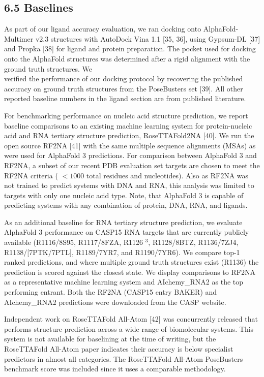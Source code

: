 \documentclass[10pt]{article}
\begin{document}
\subsection*{6.5 Baselines}
As part of our ligand accuracy evaluation, we ran docking onto AlphaFold-Multimer v2.3 structures with AutoDock Vina 1.1 [35, 36], using Gypsum-DL [37] and Propka [38] for ligand and protein preparation. The pocket used for docking onto the AlphaFold structures was determined after a rigid alignment with the ground truth structures. We\\[0pt]
verified the performance of our docking protocol by recovering the published accuracy on ground truth structures from the PoseBusters set [39]. All other reported baseline numbers in the ligand section are from published literature.

For benchmarking performance on nucleic acid structure prediction, we report baseline comparisons to an existing machine learning system for protein-nucleic acid and RNA tertiary structure prediction, RoseTTAFold2NA [40]. We run the open source RF2NA [41] with the same multiple sequence alignments (MSAs) as were used for AlphaFold 3 predictions. For comparison between AlphaFold 3 and RF2NA, a subset of our recent PDB evaluation set targets are chosen to meet the RF2NA criteria ( $<1000$ total residues and nucleotides). Also as RF2NA was not trained to predict systems with DNA and RNA, this analysis was limited to targets with only one nucleic acid type. Note, that AlphaFold 3 is capable of predicting systems with any combination of protein, DNA, RNA, and ligands.

As an additional baseline for RNA tertiary structure prediction, we evaluate AlphaFold 3 performance on CASP15 RNA targets that are currently publicly available (R1116/8S95, R1117/8FZA, R1126 ${ }^{3}$, R1128/8BTZ, R1136/7ZJ4, R1138/[7PTK/7PTL], R1189/7YR7, and R1190/7YR6). We compare top-1 ranked predictions, and where multiple ground truth structures exist (R1136) the prediction is scored against the closest state. We display comparisons to RF2NA as a representative machine learning system and AIchemy\_RNA2 as the top performing entrant. Both the RF2NA (CASP15 entry BAKER) and AIchemy\_RNA2 predictions were downloaded from the CASP website.

Independent work on RoseTTAFold All-Atom [42] was concurrently released that performs structure prediction across a wide range of biomolecular systems. This system is not available for baselining at the time of writing, but the RoseTTAFold All-Atom paper indicates their accuracy is below specialist predictors in almost all categories. The RoseTTAFold All-Atom PoseBusters benchmark score was included since it uses a comparable methodology.
\end{document}
